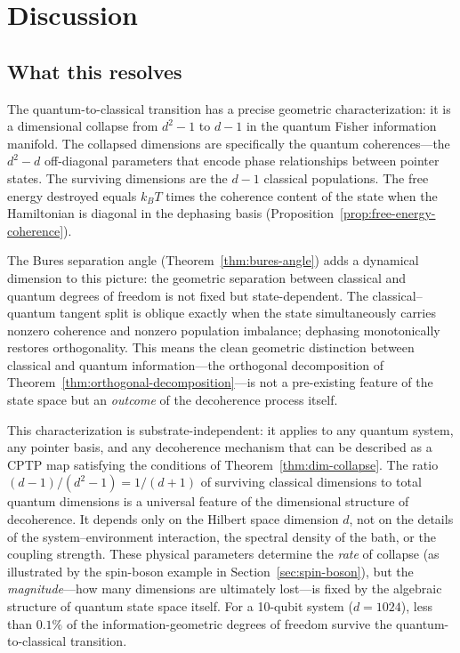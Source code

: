 \documentclass[12pt,a4paper]{article}
\theoremstyle{definition}
\theoremstyle{remark}
\begin{document}
\section{Discussion}
\label{sec:discussion}

\subsection{What this resolves}
\label{sec:resolves}

The quantum-to-classical transition has a precise geometric characterization: it is a dimensional collapse from $d^2 - 1$ to $d - 1$ in the quantum Fisher information manifold. The collapsed dimensions are specifically the quantum coherences---the $d^2 - d$ off-diagonal parameters that encode phase relationships between pointer states. The surviving dimensions are the $d - 1$ classical populations. The free energy destroyed equals $k_B T$ times the coherence content of the state when the Hamiltonian is diagonal in the dephasing basis (Proposition~\ref{prop:free-energy-coherence}).

The Bures separation angle (Theorem~\ref{thm:bures-angle}) adds a dynamical dimension to this picture: the geometric separation between classical and quantum degrees of freedom is not fixed but state-dependent.  The classical--quantum tangent split is oblique exactly when the state simultaneously carries nonzero coherence and nonzero population imbalance; dephasing monotonically restores orthogonality.  This means the clean geometric distinction between classical and quantum information---the orthogonal decomposition of Theorem~\ref{thm:orthogonal-decomposition}---is not a pre-existing feature of the state space but an \emph{outcome} of the decoherence process itself.

This characterization is substrate-independent: it applies to any quantum system, any pointer basis, and any decoherence mechanism that can be described as a CPTP map satisfying the conditions of Theorem~\ref{thm:dim-collapse}. The ratio $(d-1)/(d^2-1) = 1/(d+1)$ of surviving classical dimensions to total quantum dimensions is a universal feature of the dimensional structure of decoherence. It depends only on the Hilbert space dimension $d$, not on the details of the system--environment interaction, the spectral density of the bath, or the coupling strength. These physical parameters determine the \emph{rate} of collapse (as illustrated by the spin-boson example in Section~\ref{sec:spin-boson}), but the \emph{magnitude}---how many dimensions are ultimately lost---is fixed by the algebraic structure of quantum state space itself. For a 10-qubit system ($d = 1024$), less than $0.1\%$ of the information-geometric degrees of freedom survive the quantum-to-classical transition.
\end{document}
